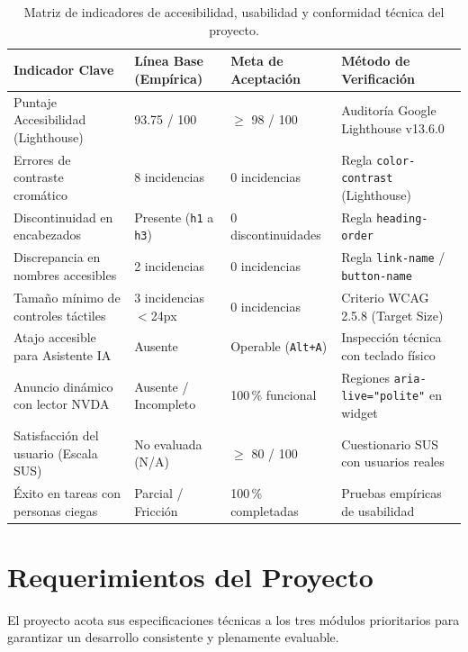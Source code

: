 \begin{table}[htbp]
  \centering
  \small
  \caption{Matriz de indicadores de accesibilidad, usabilidad y conformidad técnica del proyecto.}
  \label{tab:matriz_indicadores}
  \setlength{\tabcolsep}{3pt}
  \renewcommand{\arraystretch}{1.25}
  \begin{tabular}{|p{}|p{}|p{}|p{}|}
    \hline
    \textbf{Indicador Clave} & \textbf{Línea Base (Empírica)} & \textbf{Meta de Aceptación} & \textbf{Método de Verificación} \\
    \hline
    Puntaje Accesibilidad (Lighthouse) & 93.75 / 100 & $\ge$ 98 / 100 & Auditoría Google Lighthouse v13.6.0 \\
    \hline
    Errores de contraste cromático & 8 incidencias & 0 incidencias & Regla \texttt{color-contrast} (Lighthouse) \\
    \hline
    Discontinuidad en encabezados & Presente (\texttt{h1} a \texttt{h3}) & 0 discontinuidades & Regla \texttt{heading-order} \\
    \hline
    Discrepancia en nombres accesibles & 2 incidencias & 0 incidencias & Regla \texttt{link-name} / \texttt{button-name} \\
    \hline
    Tamaño mínimo de controles táctiles & 3 incidencias $<$24px & 0 incidencias & Criterio WCAG 2.5.8 (Target Size) \\
    \hline
    Atajo accesible para Asistente IA & Ausente & Operable (\texttt{Alt+A}) & Inspección técnica con teclado físico \\
    \hline
    Anuncio dinámico con lector NVDA & Ausente / Incompleto & 100\,\% funcional & Regiones \texttt{aria-live="polite"} en widget \\
    \hline
    Satisfacción del usuario (Escala SUS) & No evaluada (N/A) & $\ge$ 80 / 100 & Cuestionario SUS con usuarios reales \\
    \hline
    Éxito en tareas con personas ciegas & Parcial / Fricción & 100\,\% completadas & Pruebas empíricas de usabilidad \\
    \hline
  \end{tabular}
\end{table}

\section{Requerimientos del Proyecto}
El proyecto acota sus especificaciones técnicas a los tres módulos prioritarios para garantizar un desarrollo consistente y plenamente evaluable.

